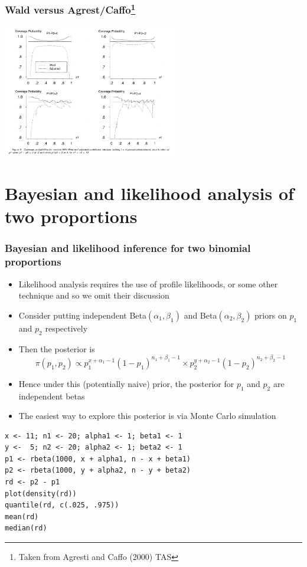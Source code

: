 \documentclass[aspectratio=169]{beamer}
\begin{document}
\begin{frame}\frametitle{Wald versus Agrest/Caffo\footnote{Taken from Agresti and Caffo (2000) TAS }}
\begin{center}
\includegraphics[width=3in]{waldTwoSample.pdf}
\end{center}
\end{frame}

\section{Bayesian and likelihood analysis of two proportions}
\begin{frame}\frametitle{Bayesian and likelihood inference for two binomial proportions}
  \begin{itemize}
  \item Likelihood analysis requires the use of profile likelihoods,
    or some other technique and so we omit their discussion
  \item Consider putting independent Beta$(\alpha_1, \beta_1)$ and Beta$(\alpha_2, \beta_2)$ priors
    on $p_1$ and $p_2$ respectively
  \item Then the posterior is
$$
\pi(p_1, p_2) \propto p_1^{x + \alpha_1 - 1}(1 - p_1)^{n_1 + \beta_1 - 1} \times  p_2^{y+\alpha_2 -1}(1 - p_2)^{n_2+\beta_2-1}
$$
  \item Hence under this (potentially naive) prior, the posterior for $p_1$ and $p_2$ are independent
    betas
  \item The easiest way to explore this posterior is via Monte Carlo simulation
  \end{itemize}
\end{frame}

\begin{frame}[fragile]
\begin{verbatim}
x <- 11; n1 <- 20; alpha1 <- 1; beta1 <- 1
y <-  5; n2 <- 20; alpha2 <- 1; beta2 <- 1
p1 <- rbeta(1000, x + alpha1, n - x + beta1)
p2 <- rbeta(1000, y + alpha2, n - y + beta2)
rd <- p2 - p1
plot(density(rd))
quantile(rd, c(.025, .975))
mean(rd)
median(rd)
\end{verbatim}
\end{frame}
\end{document}
